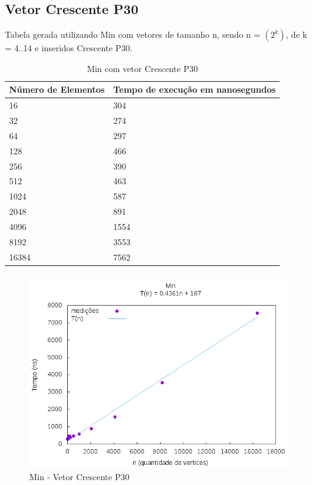 \documentclass[12pt,a4paper,twoside]{report}
\begin{document}
\subsection{Vetor Crescente P30}
Tabela gerada utilizando Min com vetores de tamanho n, sendo n = $(2^k)$, de k = 4..14 e inseridos Crescente P30.
\begin{table}[H]
\centering
\caption{Min com vetor Crescente P30}
\label{my-label}
\begin{tabular}{|l|l|}
\hline
\multicolumn{1}{|c|}{\textbf{Número de Elementos}} & \multicolumn{1}{c|}{\textbf{Tempo de execução em nanosegundos}} \\ \hline
16 & 304 \\ \hline
32 & 274 \\ \hline
64 & 297 \\ \hline
128 & 466 \\ \hline
256 & 390 \\ \hline
512 & 463 \\ \hline
1024 & 587 \\ \hline
2048 & 891 \\ \hline
4096 & 1554 \\ \hline
8192 & 3553 \\ \hline
16384 & 7562 \\ \hline

\end{tabular}
\end{table}

\begin{figure}[H]
    \centering
    \includegraphics[width=0.7\linewidth]{graficos/Min/Crescente P30/Min.png}
  \caption{Min - Vetor Crescente P30}
\end{figure}
\end{document}
